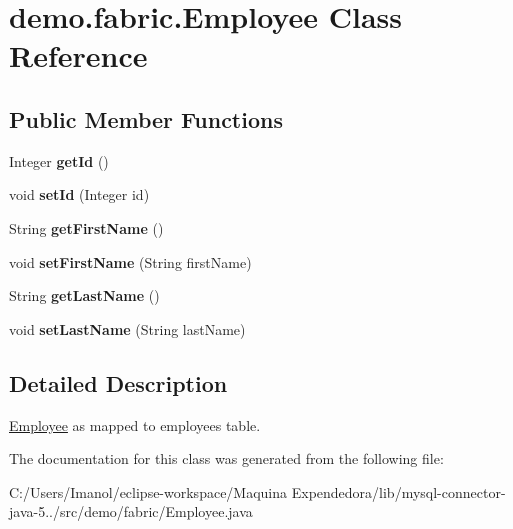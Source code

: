\hypertarget{classdemo_1_1fabric_1_1_employee}{}\section{demo.\+fabric.\+Employee Class Reference}
\label{classdemo_1_1fabric_1_1_employee}
\subsection*{Public Member Functions}
\begin{DoxyCompactItemize}
\item 
\mbox{\label{classdemo_1_1fabric_1_1_employee_a723d3605a444254e3584b83c45315b60}} 
Integer {\bfseries get\+Id} ()
\item 
\mbox{\label{classdemo_1_1fabric_1_1_employee_a76ace9abe69f331afdfeef447f29a964}} 
void {\bfseries set\+Id} (Integer id)
\item 
\mbox{\label{classdemo_1_1fabric_1_1_employee_a3d58fb4aabe3d7ce2c8ae5c1b3ca3ccd}} 
String {\bfseries get\+First\+Name} ()
\item 
\mbox{\label{classdemo_1_1fabric_1_1_employee_ab8777974cd1aa41cdeaaf59fd6fabed2}} 
void {\bfseries set\+First\+Name} (String first\+Name)
\item 
\mbox{\label{classdemo_1_1fabric_1_1_employee_ade35eefa6d88ce257b767c95cc868c09}} 
String {\bfseries get\+Last\+Name} ()
\item 
\mbox{\label{classdemo_1_1fabric_1_1_employee_a37267887f4578aae47a6a3266b8e60ef}} 
void {\bfseries set\+Last\+Name} (String last\+Name)
\end{DoxyCompactItemize}


\subsection{Detailed Description}
\mbox{\hyperlink{classdemo_1_1fabric_1_1_employee}{Employee}} as mapped to \textquotesingle{}employees\textquotesingle{} table. 

The documentation for this class was generated from the following file\+:\begin{DoxyCompactItemize}
\item 
C\+:/\+Users/\+Imanol/eclipse-\/workspace/\+Maquina Expendedora/lib/mysql-\/connector-\/java-\/5../src/demo/fabric/Employee.\+java\end{DoxyCompactItemize}
